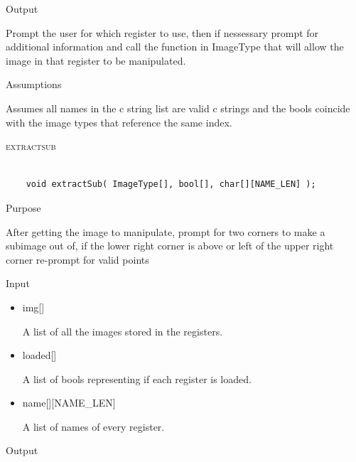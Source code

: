 \documentclass[pdftex, 11pt]{article}
\begin{document}
\begin{description}
\begin{description}
\begin{itemize}
				\end{itemize}

			\item{Output}

				Prompt the user for which register to use, then if nessessary
				prompt for additional information and call the function
				in ImageType that will allow the image in that register to
				be manipulated.

			\item{Assumptions}

				Assumes all names in the c string list are valid c
				strings and the bools coincide with the image types that
				reference the same index.

		\end{description}



	\item{\textsc{extractsub}}

		\begin{lstlisting}

	void extractSub( ImageType[], bool[], char[][NAME_LEN] );
		\end{lstlisting}

		\begin{description}
			\item{Purpose}

				After getting the image to manipulate, prompt for two corners to make a
				subimage out of, if the lower right corner is above or left of the upper
				right corner re-prompt for valid points

			\item{Input}

				\begin{itemize}

					\item{img[]}

						A list of all the images stored in the registers.

					\item{loaded[]}

						A list of bools representing if each register is loaded.

					\item{name[][NAME\_LEN]}

						A list of names of every register.

				\end{itemize}

			\item{Output}


\end{description}
\end{description}
\end{document}
